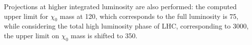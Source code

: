 \documentclass[a4paper,11pt]{article}
\newcommand{\chizero}{$\chi_0$ }
\begin{document}
Projections at higher integrated luminosity are also performed: the computed upper limit for \chizero mass at \SI{120}{\ifb}, which corresponds to the full \RunTwo luminosity is \SI{75}{\gev}, while considering the total high luminosity phase of LHC, \mbox{corresponding} to \SI{3000}{\ifb}, the upper limit on \chizero mass is shifted to \SI{350}{\gev}.
\end{document}
